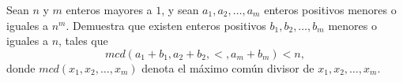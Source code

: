 Sean $n$ y $m$ enteros mayores a $1$, y sean $a_1, a_2, \dots , a_m$ enteros positivos menores o
iguales a $n^m$. Demuestra que existen enteros positivos $b_1, b_2, \dots , b_m$ menores o iguales a $n$, tales que
\[mcd(a_1 + b_1, a_2 + b_2, \lt , a_m + b_m) \lt n,\]
donde $mcd(x_1, x_2, \dots , x_m)$ denota el máximo común divisor de $x_1, x_2, \dots , x_m$.